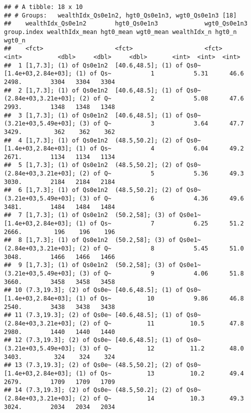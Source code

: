 \documentclass[
]{book}
\begin{document}
\begin{verbatim}
## # A tibble: 18 x 10
## # Groups:   wealthIdx_Qs0e1n2, hgt0_Qs0e1n3, wgt0_Qs0e1n3 [18]
##    wealthIdx_Qs0e1n2        hgt0_Qs0e1n3             wgt0_Qs0e1n3                   group.index wealthIdx_mean hgt0_mean wgt0_mean wealthIdx_n hgt0_n wgt0_n
##    <fct>                    <fct>                    <fct>                                <int>          <dbl>     <dbl>     <dbl>       <int>  <int>  <int>
##  1 [1,7.3]; (1) of Qs0e1n2  [40.6,48.5]; (1) of Qs0~ [1.4e+03,2.84e+03]; (1) of Qs~           1           5.31      46.6     2498.        3304   3304   3304
##  2 [1,7.3]; (1) of Qs0e1n2  [40.6,48.5]; (1) of Qs0~ (2.84e+03,3.21e+03]; (2) of Q~           2           5.08      47.6     2993.        1348   1348   1348
##  3 [1,7.3]; (1) of Qs0e1n2  [40.6,48.5]; (1) of Qs0~ (3.21e+03,5.49e+03]; (3) of Q~           3           3.64      47.7     3429.         362    362    362
##  4 [1,7.3]; (1) of Qs0e1n2  (48.5,50.2]; (2) of Qs0~ [1.4e+03,2.84e+03]; (1) of Qs~           4           6.04      49.2     2671.        1134   1134   1134
##  5 [1,7.3]; (1) of Qs0e1n2  (48.5,50.2]; (2) of Qs0~ (2.84e+03,3.21e+03]; (2) of Q~           5           5.36      49.3     3030.        2184   2184   2184
##  6 [1,7.3]; (1) of Qs0e1n2  (48.5,50.2]; (2) of Qs0~ (3.21e+03,5.49e+03]; (3) of Q~           6           4.36      49.6     3481.        1484   1484   1484
##  7 [1,7.3]; (1) of Qs0e1n2  (50.2,58]; (3) of Qs0e1~ [1.4e+03,2.84e+03]; (1) of Qs~           7           6.25      51.2     2666.         196    196    196
##  8 [1,7.3]; (1) of Qs0e1n2  (50.2,58]; (3) of Qs0e1~ (2.84e+03,3.21e+03]; (2) of Q~           8           5.45      51.0     3048.        1466   1466   1466
##  9 [1,7.3]; (1) of Qs0e1n2  (50.2,58]; (3) of Qs0e1~ (3.21e+03,5.49e+03]; (3) of Q~           9           4.06      51.8     3660.        3458   3458   3458
## 10 (7.3,19.3]; (2) of Qs0e~ [40.6,48.5]; (1) of Qs0~ [1.4e+03,2.84e+03]; (1) of Qs~          10           9.86      46.8     2540.        3438   3438   3438
## 11 (7.3,19.3]; (2) of Qs0e~ [40.6,48.5]; (1) of Qs0~ (2.84e+03,3.21e+03]; (2) of Q~          11          10.5       47.8     2980.        1440   1440   1440
## 12 (7.3,19.3]; (2) of Qs0e~ [40.6,48.5]; (1) of Qs0~ (3.21e+03,5.49e+03]; (3) of Q~          12          11.2       48.0     3403.         324    324    324
## 13 (7.3,19.3]; (2) of Qs0e~ (48.5,50.2]; (2) of Qs0~ [1.4e+03,2.84e+03]; (1) of Qs~          13          10.2       49.4     2679.        1709   1709   1709
## 14 (7.3,19.3]; (2) of Qs0e~ (48.5,50.2]; (2) of Qs0~ (2.84e+03,3.21e+03]; (2) of Q~          14          10.3       49.3     3024.        2034   2034   2034

\end{verbatim}
\end{document}
